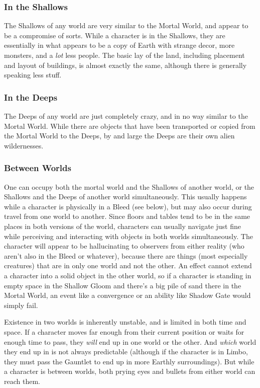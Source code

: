 \subsubsection{In the Shallows}
\hspace{\parindent} The Shallows of any world are very similar to the Mortal World, and appear to be a compromise of sorts. While a character is in the Shallows, they are essentially in what appears to be a copy of Earth with strange decor, more monsters, and a \textit{lot} less people. The basic lay of the land, including placement and layout of buildings, is almost exactly the same, although there is generally speaking less stuff. 

\subsubsection{In the Deeps}
\hspace{\parindent} The Deeps of any world are just completely crazy, and in no way similar to the Mortal World. While there are objects that have been transported or copied from the Mortal World to the Deeps, by and large the Deeps are their own alien wildernesses.

\subsubsection{Between Worlds}
\hspace{\parindent} One can occupy both the mortal world and the Shallows of another world, or the Shallows and the Deeps of another world simultaneously. This usually happens while a character is physically in a Bleed (see below), but may also occur during travel from one world to another. Since floors and tables tend to be in the same places in both versions of the world, characters can usually navigate just fine while perceiving and interacting with objects in both worlds simultaneously. The character will appear to be hallucinating to observers from either reality (who aren't also in the Bleed or whatever), because there are things (most especially creatures) that are in only one world and not the other. An effect cannot extend a character into a solid object in the other world, so if a character is standing in empty space in the Shallow Gloom and there's a big pile of sand there in the Mortal World, an event like a convergence or an ability like Shadow Gate would simply fail.

Existence in two worlds is inherently unstable, and is limited in both time and space. If a character moves far enough from their current position or waits for enough time to pass, they \textit{will} end up in one world or the other. And \textit{which} world they end up in is not always predictable (although if the character is in Limbo, they must pass the Gauntlet to end up in more Earthly surroundings). But while a character is between worlds, both prying eyes and bullets from either world can reach them.

